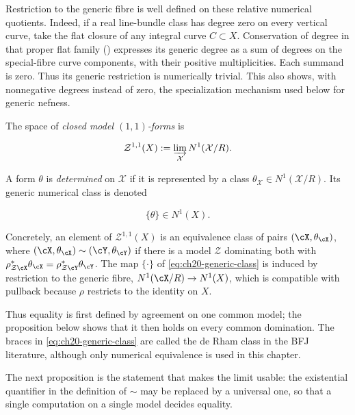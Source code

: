 Restriction to the generic fibre is well defined on these relative
numerical quotients.  Indeed, if a real line-bundle class has degree zero
on every vertical curve, take the flat closure of any integral curve
$C\subset X$.  Conservation of degree in that proper flat family
() expresses its generic
degree as a sum of degrees on the special-fibre curve components, with
their positive multiplicities.  Each summand is zero.  Thus its generic
restriction is numerically trivial.  This also shows, with nonnegative
degrees instead of zero, the specialization mechanism used below for
generic nefness.

\begin{definition}
\label{def:ch20-closed-model-form}
The space of \emph{closed model $(1,1)$-forms} is

\begin{equation}
\label{eq:ch20-model-forms}
 \mathcal Z^{1,1}(X)
   :=\varinjlim_{\mathcal X}N^1(\mathcal X/R).
\end{equation}

A form $\theta$ is \emph{determined} on $\mathcal X$ if it is represented
by a class $\theta_{\mathcal X}\in N^1(\mathcal X/R)$.  Its generic
numerical class is denoted

\begin{equation}
\label{eq:ch20-generic-class}
                 \{\theta\}\in N^1(X).
\end{equation}
\end{definition}

Concretely, an element of $\mathcal Z^{1,1}(X)$ is an equivalence class of pairs
$(\cX,\theta_{\cX})$, where $(\cX,\theta_{\cX})\sim(\cY,\theta_{\cY})$
if there is a model $\mathcal Z$ dominating both with
$\rho_{\mathcal Z\cX}^*\theta_{\cX}=\rho_{\mathcal Z\cY}^*\theta_{\cY}$.  The map
$\{\cdot\}$ of \eqref{eq:ch20-generic-class} is induced by restriction to
the generic fibre, $N^1(\cX/R)\to N^1(X)$, which is compatible with
pullback because $\rho$ restricts to the identity on $X$.

Thus equality is first defined by agreement on one common model; the
proposition below shows that it then holds on every common domination.
The braces in \eqref{eq:ch20-generic-class} are called the de Rham class in
the BFJ literature, although only numerical equivalence is used in this
chapter.

The next proposition is the statement that makes the limit usable: the
existential quantifier in the definition of $\sim$ may be replaced by a
universal one, so that a single computation on a single model decides
equality.

